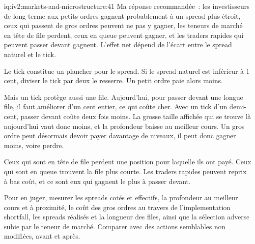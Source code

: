 \begin{solution}{iq:iv2:markets-and-microstructure:41}
Ma réponse recommandée~: les investisseurs de long terme aux petits ordres gagnent probablement à un spread plus étroit, ceux qui passent de gros ordres peuvent ne pas y gagner, les teneurs de marché en tête de file perdent, ceux en queue peuvent gagner, et les traders rapides qui peuvent passer devant gagnent. L'effet net dépend de l'écart entre le spread naturel et le tick.

Le tick constitue un plancher pour le spread. Si le spread naturel est inférieur à 1 cent, diviser le tick par deux le resserre. Un petit ordre paie alors moins.

Mais un tick protège aussi une file. Aujourd'hui, pour passer devant une longue file, il faut améliorer d'un cent entier, ce qui coûte cher. Avec un tick d'un demi-cent, passer devant coûte deux fois moins. La grosse taille affichée qui se trouve là aujourd'hui vaut donc moins, et la profondeur baisse au meilleur cours. Un gros ordre peut désormais devoir payer davantage de niveaux, il peut donc gagner moins, voire perdre.

Ceux qui sont en tête de file perdent une position pour laquelle ils ont payé. Ceux qui sont en queue trouvent la file plus courte. Les traders rapides peuvent reprix à bas coût, et ce sont eux qui gagnent le plus à passer devant.

Pour en juger, mesurer les spreads cotés et effectifs, la profondeur au meilleur cours et à proximité, le coût des gros ordres au travers de l'implementation shortfall, les spreads réalisés et la longueur des files, ainsi que la sélection adverse subie par le teneur de marché. Comparer avec des actions semblables non modifiées, avant et après.

\end{solution}

